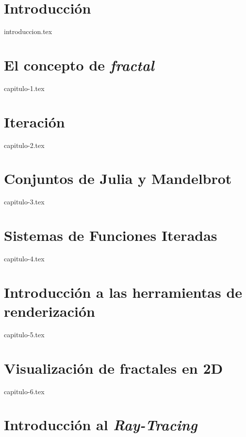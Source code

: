 \documentclass[11pt]{report}
\begin{document}
\chapter*{Introducción}
\setcounter{page}{1}


{introduccion.tex}


\chapter{El concepto de \textit{fractal}}
\label{chap:concepto}

{capitulo-1.tex}

\chapter{Iteración}
\label{chap:iteracion}

{capitulo-2.tex}


\chapter{Conjuntos de Julia y Mandelbrot}
\label{chap:Julia-Mandelbrot}

{capitulo-3.tex}

\chapter{Sistemas de Funciones Iteradas}
\label{chap:SFI}

{capitulo-4.tex}

\chapter{Introducción a las herramientas de renderización}
\label{chap:renderizacion}

{capitulo-5.tex}

\chapter{Visualización de fractales en 2D}
\label{chap:fractales-2D}

{capitulo-6.tex}

\chapter{Introducción al \textit{Ray-Tracing}}
\label{chap:ray-tracing}
\end{document}
